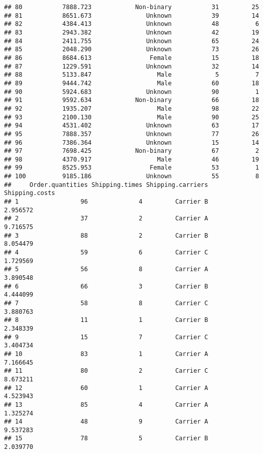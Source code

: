 \documentclass[
]{article}
\begin{document}
\begin{verbatim}
## 80           7888.723            Non-binary           31         25
## 81           8651.673               Unknown           39         14
## 82           4384.413               Unknown           48          6
## 83           2943.382               Unknown           42         19
## 84           2411.755               Unknown           65         24
## 85           2048.290               Unknown           73         26
## 86           8684.613                Female           15         18
## 87           1229.591               Unknown           32         14
## 88           5133.847                  Male            5          7
## 89           9444.742                  Male           60         18
## 90           5924.683               Unknown           90          1
## 91           9592.634            Non-binary           66         18
## 92           1935.207                  Male           98         22
## 93           2100.130                  Male           90         25
## 94           4531.402               Unknown           63         17
## 95           7888.357               Unknown           77         26
## 96           7386.364               Unknown           15         14
## 97           7698.425            Non-binary           67          2
## 98           4370.917                  Male           46         19
## 99           8525.953                Female           53          1
## 100          9185.186               Unknown           55          8
##     Order.quantities Shipping.times Shipping.carriers Shipping.costs
## 1                 96              4         Carrier B       2.956572
## 2                 37              2         Carrier A       9.716575
## 3                 88              2         Carrier B       8.054479
## 4                 59              6         Carrier C       1.729569
## 5                 56              8         Carrier A       3.890548
## 6                 66              3         Carrier B       4.444099
## 7                 58              8         Carrier C       3.880763
## 8                 11              1         Carrier B       2.348339
## 9                 15              7         Carrier C       3.404734
## 10                83              1         Carrier A       7.166645
## 11                80              2         Carrier C       8.673211
## 12                60              1         Carrier A       4.523943
## 13                85              4         Carrier A       1.325274
## 14                48              9         Carrier A       9.537283
## 15                78              5         Carrier B       2.039770

\end{verbatim}
\end{document}
